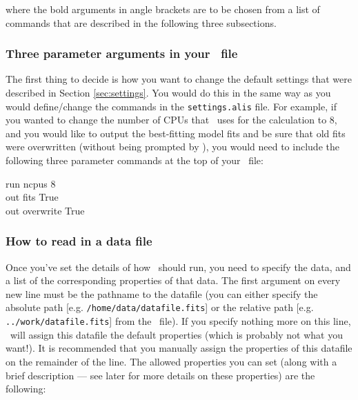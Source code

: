 \noindent
where the bold arguments in angle brackets are to be chosen from a list
of commands that are described in the following three subsections.

\subsubsection{Three parameter arguments in your \dmod\ file}

The first thing to decide is how you want to change the default settings
that were described in Section \ref{sec:settings}. You would do this in
the same way as you would define/change the commands in the
\texttt{settings.alis} file. For example, if you wanted to change the number of
CPUs that \alis\ uses for the calculation to 8, and you would like
to output the best-fitting model fits and be sure that old fits were
overwritten (without being prompted by \alis), you would need to
include the following three parameter commands at the top of your
\dmod\ file:

\vspace{0.3cm}
\begin{mdframed}[style=MyFrame]
\noindent
run ncpus 8\\
out fits True\\
out overwrite True
\end{mdframed}
\vspace{0.2cm}

\subsubsection{How to read in a data file}
\label{sec:readdata}

Once you've set the details of how \alis\ should run,
you need to specify the data, and a list of the
corresponding properties of that data. The first
argument on every new line must be the pathname
to the datafile (you can either specify the absolute
path [e.g. \texttt{/home/data/datafile.fits}] or the
relative path [e.g. \texttt{../work/datafile.fits}] from the
\dmod\ file). If you specify nothing more on this line,
\alis\ will assign this datafile the default properties
(which is probably not what you want!). It is recommended
that you manually assign the properties of this datafile on
the remainder of the line. The allowed properties you can
set (along with a brief description --- see later for more
details on these properties) are the following:

